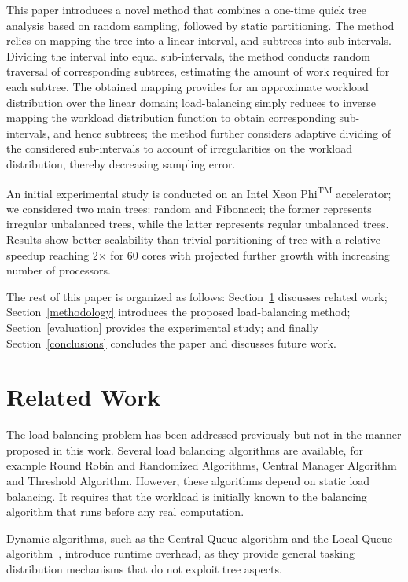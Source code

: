 \documentclass[conference,compsoc]{IEEEtran}
\begin{document}
	This paper introduces a novel method that combines a one-time quick tree analysis based on random sampling, followed by static partitioning. The method relies on mapping the tree into a linear interval, and subtrees into sub-intervals. Dividing the interval into equal sub-intervals, the method conducts random traversal of corresponding subtrees, estimating the amount of work required for each subtree. The obtained mapping provides for an approximate workload distribution over the linear domain; load-balancing simply reduces to inverse mapping the workload distribution function to obtain corresponding sub-intervals, and hence subtrees; the method further considers adaptive dividing of the considered sub-intervals to account of irregularities on the workload distribution, thereby decreasing sampling error.
	
	
	An initial experimental study is conducted on an Intel\textsuperscript{\textregistered} Xeon Phi\textsuperscript{TM} accelerator; we considered two main trees: random and Fibonacci; the former represents irregular unbalanced trees, while the latter represents regular unbalanced trees. Results show better scalability than trivial partitioning of tree with a relative speedup reaching 2$\times$ for 60 cores with projected further growth with increasing number of processors. 
		
	The rest of this paper is organized as follows: Section~\ref{related-work} discusses related work; Section~\ref{methodology} introduces the proposed load-balancing method; Section~\ref{evaluation} provides the experimental study; and finally Section~\ref{conclusions} concludes the paper and discusses future work.
	
	\section{Related Work}
	\label{related-work}
	The load-balancing problem has been addressed previously but not in the manner proposed in this work. Several load balancing algorithms are available, for example Round Robin and Randomized Algorithms, Central Manager Algorithm and Threshold Algorithm. However, these algorithms depend on static load balancing. It requires that the workload is initially known to the balancing algorithm that runs before any real computation.
	
	Dynamic algorithms, such as the Central Queue algorithm and the Local Queue algorithm~\cite{Chakrabarti1994}, introduce runtime overhead, as they provide general tasking distribution mechanisms that do not exploit tree  aspects.
	
\end{document}
